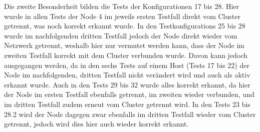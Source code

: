 Die zweite Besonderheit bilden die \glspl{Test} der Konfigurationen 17 bis 28.
Hier wurde in allen \glspl{Test} der Node 4 im jeweils ersten \gls{Testfall} direkt vom Cluster getrennt, was noch korrekt erkannt wurde.
In den \glspl{Testkonfiguration} 25 bis 28 wurde im nachfolgenden dritten \gls{Testfall} jedoch der Node direkt wieder vom Netzwerk getrennt, weshalb hier nur vermutet werden kann, dass der Node im zweiten \gls{Testfall} korrekt mit dem Cluster verbunden wurde.
Davon kann jedoch ausgegangen werden, da in den sechs \glspl{Test} auf einem Host (Tests 17 bis 22) der Node im nachfolgenden, dritten \gls{Testfall} nicht verändert wird und auch als aktiv erkannt wurde.
Auch in den \glspl{Test} 29 bis 32 wurde alles korrekt erkannt, da hier der Node im ersten \gls{Testfall} ebenfalls getrennt, im zweiten wieder verbunden, und im dritten \gls{Testfall} zudem erneut vom Cluster getrennt wird.
In den \glspl{Test} 23 bis 28.2 wird der Node dagegen zwar ebenfalls im dritten \gls{Testfall} wieder vom Cluster getrennt, jedoch wird dies hier auch wieder korrekt erkannt.
